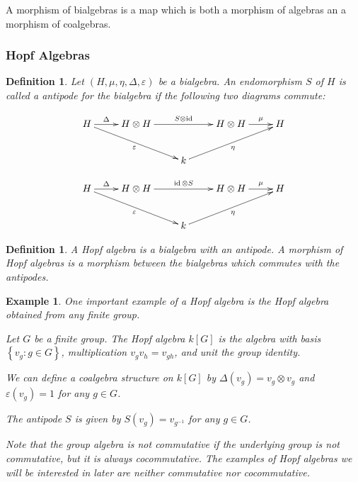 \documentclass[]{article}
\newtheorem{defn}[theorem]{Definition}
\newtheorem{example}[theorem]{Example}
\newcommand{\id}{\operatorname{id}}
\numberwithin{equation}{subsection}
\begin{document}
A morphism of bialgebras is a map which is both a morphism of algebras an a
morphism of coalgebras.
\subsubsection{Hopf Algebras}


\begin{defn}
    Let $(H, \mu, \eta, \Delta, \varepsilon)$ be a bialgebra. An endomorphism
    $S$ of $H$ is called a \emph{antipode} for the bialgebra if the following
    two diagrams commute:

    \begin{equation}
        \xymatrix{
        H \ar[r]^-{\Delta} \ar[rrd]_-{\varepsilon}& H \otimes H \ar[rr]^-{S \otimes \id} & & H \otimes H \ar[r]^-{\mu} & H \\
        & & k \ar[rru]_-{\eta}& &
        }
    \end{equation}

    \begin{equation}
        \xymatrix{
        H \ar[r]^-{\Delta} \ar[rrd]_-{\varepsilon}& H \otimes H \ar[rr]^-{\id \otimes S} & & H \otimes H \ar[r]^-{\mu} & H \\
        & & k \ar[rru]_-{\eta}& &
        }
    \end{equation}
\end{defn}

\begin{defn}
    A \emph{Hopf algebra} is a bialgebra with an antipode. A morphism of Hopf
    algebras is a morphism between the bialgebras which commutes with the
    antipodes. 
\end{defn}

\begin{example}
    \label{groupalgebra}
    One important example of a Hopf algebra is the Hopf algebra obtained from
    any finite group. 

    Let $G$ be a finite group. The Hopf algebra $k[G]$ is the algebra with
    basis $\left\{ v_g: g \in G \right\}$, multiplication $v_g v_h = v_{gh}$,
    and unit the group identity. 

    We can define a coalgebra structure on $k[G]$ by $\Delta(v_g) = v_g \otimes v_g$
    and $\varepsilon(v_g) = 1$ for any $g \in G$.

    The antipode $S$ is given by $S(v_g) = v_{g^{-1}}$ for any $g \in G$.

    Note that the group algebra is not commutative if the underlying group is
    not commutative, but it is always cocommutative. The examples of Hopf
    algebras we will be interested in later are neither commutative nor
    cocommutative. 
\end{example}
\end{document}
